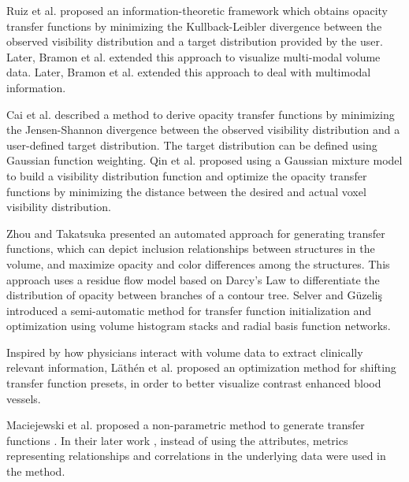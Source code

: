 \documentclass{egpubl}
\begin{document}
Ruiz et al. \cite{ruiz_automatic_2011} proposed an information-theoretic framework which obtains opacity transfer functions by minimizing the Kullback-Leibler divergence between the observed visibility distribution and a target distribution provided by the user. Later, Bramon et al. \cite{bramon_information_2013} extended this approach to visualize multi-modal volume data.
Later, Bramon et al. \cite{bramon_information_2013} extended this approach to deal with multimodal information.

Cai et al. \cite{cai_automatic_2013} described a method to derive opacity transfer functions by minimizing the Jensen-Shannon divergence between the observed visibility distribution and a user-defined target distribution. The target distribution can be defined using Gaussian function weighting.
Qin et al. \cite{qin_voxel_2015} proposed using a Gaussian mixture model to build a visibility distribution function and optimize the opacity transfer functions by minimizing the distance between the desired and actual voxel visibility distribution.

Zhou and Takatsuka \cite{zhou_automatic_2009} presented an automated approach for generating transfer functions, which can depict inclusion relationships between structures in the volume, and maximize opacity and color differences among the structures. This approach uses a residue flow model based on Darcy's Law to differentiate the distribution of opacity between branches of a contour tree.
Selver and G{\"u}zeli{\c s} \cite{alper_selver_semiautomatic_2009} introduced a semi-automatic method for transfer function initialization and optimization using volume histogram stacks and radial basis function networks.

Inspired by how physicians interact with volume data to extract clinically relevant information, L{\"a}th{\'e}n et al. \cite{lathen_automatic_2012} proposed an optimization method for shifting transfer function presets, in order to better visualize contrast enhanced blood vessels.

Maciejewski et al. proposed a non-parametric method to generate transfer functions \cite{maciejewski_structuring_2009}.
In their later work \cite{maciejewski_abstracting_2013}, instead of using the attributes, metrics representing relationships and correlations in the underlying data were used in the method.
\end{document}
